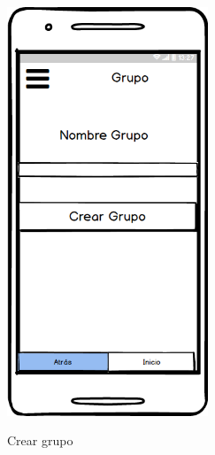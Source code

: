 \begin{figure}[htbp]
\begin{minipage}[b]{0.5\linewidth}
\end{minipage}

\end{figure}










	
	\begin{figure}[htbp]
\begin{minipage}[b]{0.5\linewidth} %
\centering
\includegraphics[width=6cm]{maqueta/Crear-Grupo.png}
 \label{figura1}
\caption{Crear grupo}


\end{minipage}
\end{figure}
